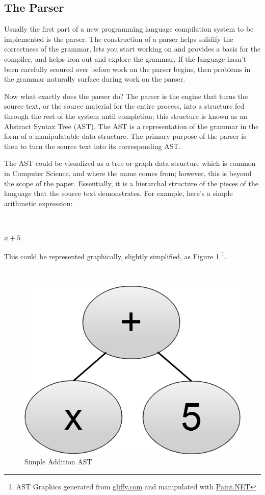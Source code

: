 \documentclass[titlepage]{article}
\begin{document}
		\subsection{The Parser}

			Usually the first part of a new programming language compilation system to be implemented is the parser.  The construction of a parser helps solidify the correctness of the grammar, lets you start working on and provides a basis for the compiler, and helps iron out and explore the grammar.  If the language hasn't been carefully scoured over before work on the parser begins, then problems in the grammar naturally surface during work on the parser.

			Now what exactly does the parser do?  The parser is the engine that turns the source text, or the source material for the entire process, into a structure fed through the rest of the system until completion; this structure is known as an Abstract Syntax Tree (AST).  The AST is a representation of the grammar in the form of a manipulatable data structure.  The primary purpose of the parser is then to turn the source text into its corresponding AST.

			The AST could be visualized as a tree or graph data structure which is common in Computer Science, and where the name comes from; however, this is beyond the scope of the paper.  Essentially, it is a hierarchal structure of the pieces of the language that the source text demonstrates.  For example, here's a simple arithmetic expression:
			\newline

			~\centerline{\Large{$x + 5$}}
			\newline

			This could be represented graphically, slightly simplified, as Figure 1
			\footnote{AST Graphics generated from \href{http://www.gliffy.com}{gliffy.com} and manipulated with \href{http://www.getpaint.net/}{Paint.NET}}.
			\newline

			\begin{figure}
				\caption{Simple Addition AST}
				~\centerline{\includegraphics[scale=.3]{ExampleSimpleAST.png}}
			\end{figure}
\end{document}
